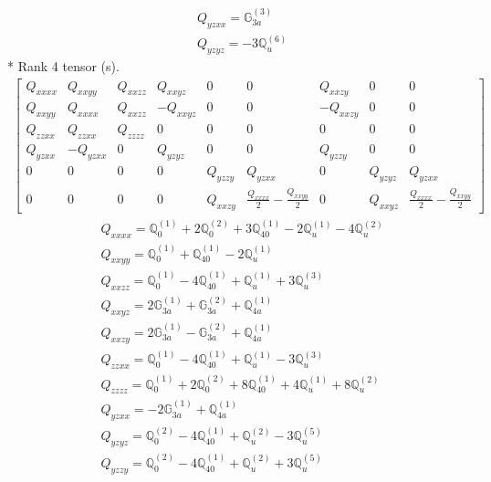 \documentclass[fleqn,8pt,landscape]{jsarticle}
\begin{document}
\begin{align*}
& Q_{yzxx} = \mathbb{G}_{3a}^{(3)} \\
& Q_{yzyz} = - 3 \mathbb{Q}_{u}^{(6)}
\end{align*}
* Rank 4 tensor (s).
\begin{align*}
\begin{bmatrix} Q_{xxxx} & Q_{xxyy} & Q_{xxzz} & Q_{xxyz} & 0 & 0 & Q_{xxzy} & 0 & 0 \\ Q_{xxyy} & Q_{xxxx} & Q_{xxzz} & - Q_{xxyz} & 0 & 0 & - Q_{xxzy} & 0 & 0 \\ Q_{zzxx} & Q_{zzxx} & Q_{zzzz} & 0 & 0 & 0 & 0 & 0 & 0 \\ Q_{yzxx} & - Q_{yzxx} & 0 & Q_{yzyz} & 0 & 0 & Q_{yzzy} & 0 & 0 \\ 0 & 0 & 0 & 0 & Q_{yzzy} & Q_{yzxx} & 0 & Q_{yzyz} & Q_{yzxx} \\ 0 & 0 & 0 & 0 & Q_{xxzy} & \frac{Q_{xxxx}}{2} - \frac{Q_{xxyy}}{2} & 0 & Q_{xxyz} & \frac{Q_{xxxx}}{2} - \frac{Q_{xxyy}}{2} \end{bmatrix}
\end{align*}
\begin{align*}
& Q_{xxxx} = \mathbb{Q}_{0}^{(1)} + 2 \mathbb{Q}_{0}^{(2)} + 3 \mathbb{Q}_{40}^{(1)} - 2 \mathbb{Q}_{u}^{(1)} - 4 \mathbb{Q}_{u}^{(2)} \\
& Q_{xxyy} = \mathbb{Q}_{0}^{(1)} + \mathbb{Q}_{40}^{(1)} - 2 \mathbb{Q}_{u}^{(1)} \\
& Q_{xxzz} = \mathbb{Q}_{0}^{(1)} - 4 \mathbb{Q}_{40}^{(1)} + \mathbb{Q}_{u}^{(1)} + 3 \mathbb{Q}_{u}^{(3)} \\
& Q_{xxyz} = 2 \mathbb{G}_{3a}^{(1)} + \mathbb{G}_{3a}^{(2)} + \mathbb{Q}_{4a}^{(1)} \\
& Q_{xxzy} = 2 \mathbb{G}_{3a}^{(1)} - \mathbb{G}_{3a}^{(2)} + \mathbb{Q}_{4a}^{(1)} \\
& Q_{zzxx} = \mathbb{Q}_{0}^{(1)} - 4 \mathbb{Q}_{40}^{(1)} + \mathbb{Q}_{u}^{(1)} - 3 \mathbb{Q}_{u}^{(3)} \\
& Q_{zzzz} = \mathbb{Q}_{0}^{(1)} + 2 \mathbb{Q}_{0}^{(2)} + 8 \mathbb{Q}_{40}^{(1)} + 4 \mathbb{Q}_{u}^{(1)} + 8 \mathbb{Q}_{u}^{(2)} \\
& Q_{yzxx} = - 2 \mathbb{G}_{3a}^{(1)} + \mathbb{Q}_{4a}^{(1)} \\
& Q_{yzyz} = \mathbb{Q}_{0}^{(2)} - 4 \mathbb{Q}_{40}^{(1)} + \mathbb{Q}_{u}^{(2)} - 3 \mathbb{Q}_{u}^{(5)} \\
& Q_{yzzy} = \mathbb{Q}_{0}^{(2)} - 4 \mathbb{Q}_{40}^{(1)} + \mathbb{Q}_{u}^{(2)} + 3 \mathbb{Q}_{u}^{(5)}
\end{align*}
\end{document}
